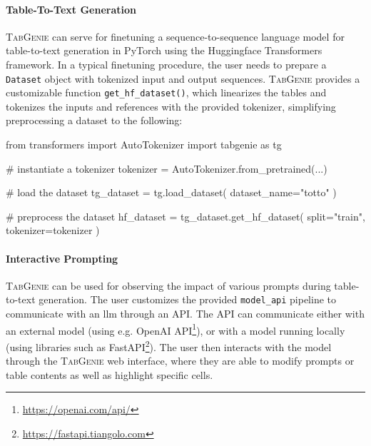 \paragraph{Table-To-Text Generation} \textsc{TabGenie} can serve for finetuning a sequence-to-sequence language model for table-to-text generation in PyTorch \cite{paszke2019pytorch} using the Huggingface Transformers \cite{wolf2019HuggingFacesTS} framework. In a typical finetuning procedure, the user needs to prepare a \texttt{Dataset} object with tokenized input and output sequences. \textsc{TabGenie} provides a customizable function \texttt{get\_hf\_dataset()}, which linearizes the tables and tokenizes the inputs and references with the provided tokenizer, simplifying preprocessing a dataset to the following:
\begin{python}
from transformers import AutoTokenizer
import tabgenie as tg

# instantiate a tokenizer
tokenizer = AutoTokenizer.from_pretrained(...)

# load the dataset
tg_dataset = tg.load_dataset(
    dataset_name="totto"
)

# preprocess the dataset
hf_dataset = tg_dataset.get_hf_dataset(
    split="train",
    tokenizer=tokenizer
)
\end{python}



\paragraph{Interactive Prompting} \textsc{TabGenie} can be used for observing the impact of various prompts during table-to-text generation. The user customizes the provided \texttt{model\_api} pipeline to communicate with an \ac{llm} through an API. The API can communicate either with an external model (using e.g. OpenAI API\footnote{\url{https://openai.com/api/}}), or with a model running locally (using libraries such as FastAPI\footnote{\url{https://fastapi.tiangolo.com}}). The user then interacts with the model through the \textsc{TabGenie} web interface, where they are able to modify prompts or table contents as well as highlight specific cells.

